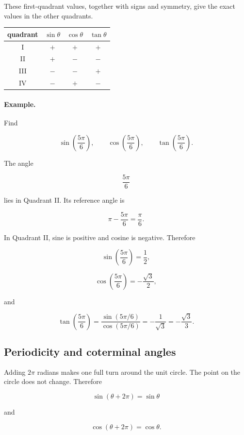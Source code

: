 These first-quadrant values, together with signs and symmetry, give the exact values
in the other quadrants.

\begin{center}
\renewcommand{\arraystretch}{1.5}
\begin{tabular}{c|ccc}
\textbf{quadrant} & \(\sin\theta\) & \(\cos\theta\) & \(\tan\theta\) \\ \hline
I & \(+\) & \(+\) & \(+\) \\
II & \(+\) & \(-\) & \(-\) \\
III & \(-\) & \(-\) & \(+\) \\
IV & \(-\) & \(+\) & \(-\)
\end{tabular}
\end{center}

\paragraph{Example.}
Find

\[
\sin\left(\frac{5\pi}{6}\right),
\qquad
\cos\left(\frac{5\pi}{6}\right),
\qquad
\tan\left(\frac{5\pi}{6}\right).
\]

The angle

\[
\frac{5\pi}{6}
\]

lies in Quadrant II.  Its reference angle is

\[
\pi-\frac{5\pi}{6}=\frac{\pi}{6}.
\]

In Quadrant II, sine is positive and cosine is negative.  Therefore

\[
\sin\left(\frac{5\pi}{6}\right)=\frac12,
\]

\[
\cos\left(\frac{5\pi}{6}\right)=-\frac{\sqrt3}{2},
\]

and

\[
\tan\left(\frac{5\pi}{6}\right)
=
\frac{\sin(5\pi/6)}{\cos(5\pi/6)}
=
-\frac1{\sqrt3}
=
-\frac{\sqrt3}{3}.
\]

\subsection{Periodicity and coterminal angles}
\label{appsubsec:periodicity-coterminal}

Adding \(2\pi\) radians makes one full turn around the unit circle.  The point on the
circle does not change.  Therefore

\[
\boxed{
\sin(\theta+2\pi)=\sin\theta
}
\]

and

\[
\boxed{
\cos(\theta+2\pi)=\cos\theta.
}
\]


